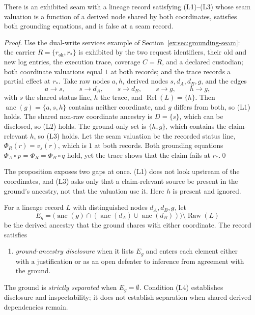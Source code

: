 \documentclass[smallextended,envcountsect,envcountsame,natbib]{svjour3}
\begin{document}
\begin{proposition}\label{ex:prop:laundering}
There is an exhibited seam with a lineage record satisfying (L1)--(L3) whose seam valuation is a function of a derived node shared by both coordinates, satisfies both grounding equations, and is false at a seam record.
\end{proposition}
\begin{proof}
Use the dual-write services example of Section~\ref{ex:sec:grounding-seam}: the carrier $R=\{r_{\mathrm{ok}},r_*\}$ is exhibited by the two request identifiers, their old and new log entries, the execution trace, coverage $C=R$, and a declared custodian; both coordinate valuations equal $1$ at both records; and the trace records a partial effect at $r_*$. Take raw nodes $a,h$, derived nodes $s,d_A,d_B,g$, and the edges
\[
a\to s,\qquad s\to d_A,\qquad s\to d_B,\qquad s\to g,\qquad h\to g,
\]
with $s$ the shared status line, $h$ the trace, and $\operatorname{Rel}(L)=\{h\}$. Then $\operatorname{anc}(g)=\{a,s,h\}$ contains neither coordinate, and $g$ differs from both, so (L1) holds. The shared non-raw coordinate ancestry is $D=\{s\}$, which can be disclosed, so (L2) holds. The ground-only set is $\{h,g\}$, which contains the claim-relevant $h$, so (L3) holds. Let the seam valuation be the recorded status line, $\Phi_R(r)=v_s(r)$, which is $1$ at both records. Both grounding equations $\Phi_A\circ p=\Phi_R=\Phi_B\circ q$ hold, yet the trace shows that the claim fails at $r_*$.\qed
\end{proof}

The proposition exposes two gaps at once. (L1) does not look upstream of the coordinates, and (L3) asks only that a claim-relevant source be present in the ground's ancestry, not that the valuation use it. Here $h$ is present and ignored.

\begin{definition}\label{ex:def:separation}
For a lineage record $L$ with distinguished nodes $d_A,d_B,g$, let
\[
E_g=\bigl(\operatorname{anc}(g)\cap(\operatorname{anc}(d_A)\cup\operatorname{anc}(d_B))\bigr)\setminus\operatorname{Raw}(L)
\]
be the derived ancestry that the ground shares with either coordinate. The record satisfies
\begin{enumerate}
\item[(L4)] \emph{ground-ancestry disclosure} when it lists $E_g$ and enters each element either with a justification or as an open defeater to inference from agreement with the ground.
\end{enumerate}
The ground is \emph{strictly separated} when $E_g=\emptyset$. Condition (L4) establishes disclosure and inspectability; it does not establish separation when shared derived dependencies remain.
\end{definition}
\end{document}
